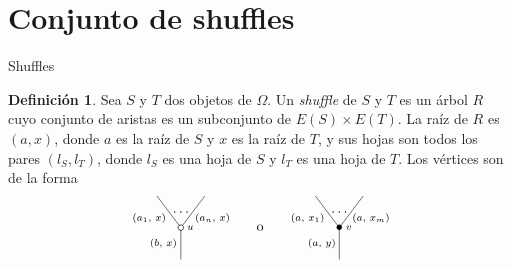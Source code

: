 \documentclass[12pt,aspectratio=169]{beamer}
\numberwithin{equation}{section}
\theoremstyle{definition}
\newtheorem{defi}[teo]{Definici\'on}
\begin{document}
\section{Conjunto de shuffles}

\begin{frame}{Shuffles}
    \begin{defi}
        Sea $S$ y $T$ dos objetos de $\Omega$. Un \emph{shuffle} de $S$ y $T$ es un \'arbol $R$ cuyo conjunto de aristas es un subconjunto de $E(S)\times E(T)$. La ra\'iz de $R$ es $(a,x)$, donde $a$ es la ra\'iz de $S$ y $x$ es la ra\'iz de $T$,
        y sus hojas son todos los pares $(l_S,l_T)$, donde $l_S$ es una hoja de $S$ y $l_T$ es una hoja de $T$. Los v\'ertices son de la forma
        $$
            \xy
            <0.08cm, 0cm>:
            (0.0, 0.0)*{}="1"; %
            (0.0, 10.0)*\cir<2pt>{}="2"; %
            (-7.5, 20.0)*{}="3"; %
            (7.5, 20.0)*{}="4"; %
            "1";"2" **\dir{-};
            "2";"3" **\dir{-};
            "2";"4" **\dir{-};
            (3.0, 10.0)*=0{\scriptstyle u};
            (-5.5, 5)*=0{\scriptstyle (b,\text{ }x)};
            (-10, 13.0)*=0{\scriptstyle (a_1,\text{ }x)};
            (10, 13.0)*=0{\scriptstyle (a_n,\text{ }x)};
            (0,15)*{\dots};
            \endxy
            \xy
            <0.08cm, 0cm>:
            (-15, 0.0)*{}="1";
            (15, 10.0)*{}="2";
            (0,10)*{\rm o};
            \endxy
            \xy
            <0.08cm, 0cm>:
            (0.0, 0.0)*{}="1"; %
            (0.0, 10.0)*=0{\bullet}="2"; %
            (-7.5, 20.0)*{}="3"; %
            (7.5, 20.0)*{}="4"; %
            "1";"2" **\dir{-};
            "2";"3" **\dir{-};
            "2";"4" **\dir{-};
            (3.0, 10.0)*=0{\scriptstyle v};
            (-5.5, 5)*=0{\scriptstyle (a,\text{ }y)};
            (-10, 13.0)*=0{\scriptstyle (a,\text{ }x_1)};
            (10, 13.0)*=0{\scriptstyle (a,\text{ }x_m)};
            (0,15)*{\dots};
            \endxy
        $$
    
    \end{defi}
\end{frame}
\end{document}
